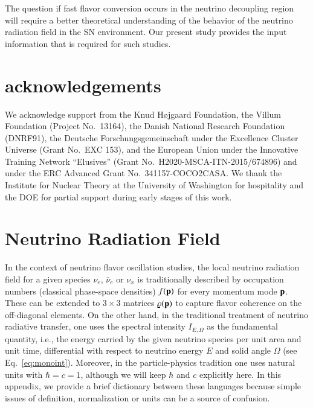 \documentclass[iop,twocolappendix,numberedappendix]{emulateapj}
\begin{document}
The question if fast flavor conversion occurs in the neutrino decoupling
region will require a better theoretical understanding of the behavior of the
neutrino radiation field in the SN environment. Our present study provides
the input information that is required for such studies.

\section*{acknowledgements}

We acknowledge support from the Knud H{\o}jgaard Foundation, the Villum
Foundation (Project No.\ 13164), the Danish National Research Foundation
(DNRF91), the Deutsche Forschungsgemeinschaft under the Excellence Cluster
Universe (Grant No.\ EXC 153), and the European Union under the Innovative
Training Network ``Elusives'' (Grant No.\ H2020-MSCA-ITN-2015/674896) and
under the ERC Advanced Grant No.\ 341157-COCO2CASA. We
thank the Institute for Nuclear Theory at the University of Washington for
hospitality and the DOE for partial support during early stages of
this work.



\appendix

\section{Neutrino Radiation Field} \label{sec:RadiationField}

In the context of neutrino flavor oscillation studies, the local neutrino
radiation field for a given species $\nu_e$, $\bar\nu_e$ or $\nu_x$ is
traditionally described by occupation numbers (classical phase-space
densities) $f({\bf p})$ for every momentum mode ${\bf p}$. These can be
extended to $3{\times}3$ matrices $\varrho({\bf p})$ to capture flavor
coherence on the off-diagonal elements. On the other hand, in
the traditional treatment of neutrino radiative transfer, one uses the
spectral intensity $I_{E,\Omega}$ as the fundamental quantity, i.e., the
energy carried by the given neutrino species per unit area and unit time, 
differential with respect 
to neutrino energy $E$ and solid angle $\Omega$ (see Eq.~\ref{eq:monoint}).
 Moreover, in the particle-physics tradition one uses natural
units with $\hbar=c=1$, although we will keep $\hbar$ and $c$
explicitly here. In this appendix, we provide a brief dictionary between these
languages because simple issues of definition, normalization or units can be
a source of confusion.
\end{document}
